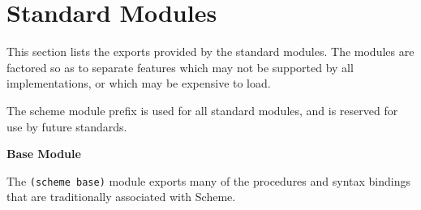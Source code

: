 \chapter{Standard Modules}
\label{stdmodules}


This section lists the exports provided by the standard modules.  The
modules are factored so as to separate features which may not be
supported by all implementations, or which may be expensive to load.

The {\cf scheme} module prefix is used for all standard modules, and
is reserved for use by future standards.

\textbf{Base Module}

The \texttt{(scheme base)} module exports many of the procedures and
syntax bindings that are traditionally associated with Scheme.

